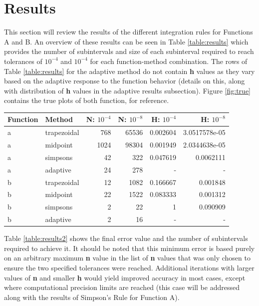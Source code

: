 \documentclass[a4paper]{article}
\begin{document}
\newpage
\section{Results}
\label{sec:results}

This section will review the results of the different integration rules for Functions A and B. An overview of these results can be seen in Table \ref{table:results} which provides the number of subintervals and size of each subinterval required to reach tolerances of $10^{-4}$ and $10^{-4}$ for each function-method combination. The rows of Table \ref{table:results} for the adaptive method do not contain \textbf{h} values as they vary based on the adaptive response to the function behavior (details on this, along with distribution of \textbf{h} values in the adaptive results subsection). Figure \ref{fig:true} contains the true plots of both function, for reference.


\bgroup
\def\arraystretch{1.5}
\begin{center}
	\centering
	\begin{tabular}{l|l|r|r|r|r}
	\textbf{Function} & \textbf{Method} & \textbf{N: $10^{-4}$} & \textbf{N: $10^{-8}$} & \textbf{H: $10^{-4}$} & \textbf{H: $10^{-8}$} \\
	\hline  
	a & trapezoidal & 768  & 65536 & 0.002604 & 3.0517578e-05 \\
    a & midpoint    & 1024 & 98304 & 0.001949 & 2.0344638e-05 \\
    a & simpsons    & 42   & 322   & 0.047619 & 0.0062111 	 \\
    a & adaptive    & 24   & 278   & - 		 & -             \\
    b & trapezoidal & 12   & 1082  & 0.166667 & 0.001848 		 \\
    b & midpoint    & 22   & 1522  & 0.083333 & 0.001312 		 \\
    b & simpsons    & 2    & 22    & 1 		 & 0.090909 		 \\
    b & adaptive    & 2    & 16    & - 		 & -  
	\end{tabular}
	\label{table:results}
\end{center}
\egroup

Table \ref{table:results2} shows the final error value and the number of subintervals required to achieve it. It should be noted that this minimum error is based purely on an arbitrary maximum \textbf{n} value in the list of \textbf{n} values that was only chosen to ensure the two specified tolerances were reached. Additional iterations with larger values of \textbf{n} and smaller \textbf{h} would yield improved accuracy in most cases, except where computational precision limits are reached (this case will be addressed along with the results of Simpson's Rule for Function A).
\end{document}
